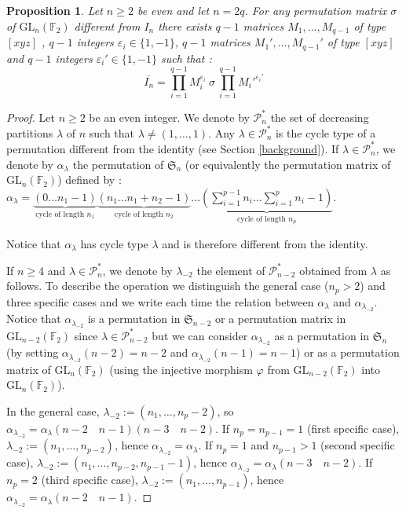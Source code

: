 \documentclass[a4paper,12pt,fleqn]{article}
\newcommand\SYM[1][n]{\mathfrak{S}_{#1}}
\newcommand\GL[1][n]{\mathrm{GL}_{#1}(\mathbb{F}_2)}
\renewcommand\phi{\varphi}
\renewcommand\epsilon{\varepsilon}
\renewcommand\geq{\geqslant}
\newtheorem{prop}[theo]{Proposition}
\begin{document}
\begin{prop}\label{ibarsigmaprop} Let $n\geq  2$ be even and let $n=2q$. For any permutation matrix $\sigma$ of $\GL[n]$ different from $I_n$ there exists $q-1$ matrices $M_1,\dots,M_{q-1}$ of type $[xyz]$ , $q-1$ integers $\epsilon_i\in\{1,-1\}$, $q-1$ matrices $M_1',\dots,M_{q-1}'$ of type $[xyz]$ and $q-1$ integers $\epsilon_i'\in\{1,-1\}$ such that :  
  \begin{equation}\label{ibarsigma}
    \overline{ I_n}=\prod\limits_{i=1}^{q-1}M_i^{\varepsilon_i}\ \sigma\ \prod\limits_{i=1}^{q-1}M_i'^{\varepsilon_i'}
\end{equation}
    \end{prop}

    \begin{proof} Let $n\geq  2$ be an even integer. We denote by $\mathcal{P}_n^{*}$ the set of decreasing partitions $\lambda$ of $n$  such that
      $\lambda\neq (1,\dots,1)$. Any $\lambda\in\mathcal{P}_n^{*}$ is the cycle type of a permutation different from the identity (see Section \ref{background}).
      If $\lambda\in\mathcal{P}_n^{*}$, we denote by  $\alpha_{\lambda}$ the permutation of $\SYM$ (or equivalently the permutation matrix of $\GL$)
      defined by :      $\alpha_{\lambda}=\underbrace{(0\dots n_1-1)}_{\text{cycle of length } n_1}
    \underbrace{(n_1\dots n_1+n_2-1)}_{\text{cycle of length } n_2}\dots
    \underbrace{(\sum\limits_{i=1}^{p-1} n_i\dots\sum\limits_{i=1}^{p} n_i-1)}_{\text{cycle of length } n_p}$.
    
    Notice that $\alpha_{\lambda}$ has cycle type $\lambda$ and is therefore different from the identity.
    
    If $n\geq  4$ and $\lambda\in\mathcal{P}_n^{*}$, we denote by $\lambda_{-2}$ the element of $\mathcal{P}_{n-2}^{*}$ obtained from $\lambda$ as follows. To describe
    the operation we distinguish the general case ($n_p>2$) and three specific cases and we write each time the relation between
    $\alpha_{\lambda}$ and $\alpha_{\lambda_{-2}}$.
    Notice that $\alpha_{\lambda_{-2}}$ is a permutation in $\SYM[n-2]$ or a permutation matrix in $\GL[n-2]$ since $\lambda\in\mathcal{P}_{n-2}^{*}$ but we can consider
    $\alpha_{\lambda_{-2}}$ as a permutation in $\SYM[n]$ (by setting $\alpha_{\lambda_{-2}}(n-2)=n-2$ and $\alpha_{\lambda_{-2}}(n-1)=n-1$) or as a permutation matrix of $\GL[n]$    (using the injective morphism $\phi$ from $\GL[n-2]$ into $\GL$).

    In the general case, $\lambda_{-2}:=(n_1,\dots,n_{p}-2)$, so $\alpha_{\lambda_{-2}}=\alpha_{\lambda}(n-2\quad n-1)(n-3\quad n-2)$.
    If $n_p=n_{p-1}=1$ (first specific case), $\lambda_{-2}:=(n_1,\dots,n_{p-2})$, hence $\alpha_{\lambda_{-2}}=\alpha_{\lambda}$.
    If $n_p=1$ and $n_{p-1}>1$ (second specific case), $\lambda_{-2}:=(n_1,\dots,n_{p-2},n_{p-1}-1)$, hence $\alpha_{\lambda_{-2}}=\alpha_{\lambda}(n-3\quad n-2)$.
      If $n_p=2$ (third specific case), $\lambda_{-2}:=(n_1,\dots,n_{p-1})$,  hence  $\alpha_{\lambda_{-2}}=\alpha_{\lambda}(n-2\quad n-1)$.
    


\end{proof}
\end{document}
